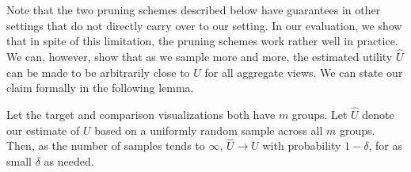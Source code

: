 
Note that the two pruning schemes described below have guarantees
in other settings that do not directly carry over to our setting.
In our evaluation, we show that in spite of this limitation, the pruning schemes
work rather well in practice. 
We can, however, show that as we sample more and more, the estimated utility
$\hat{U}$ can be made to be arbitrarily close to $U$ for all aggregate views.
We can state our claim formally in the following lemma. 

\begin{lemma}
Let the target and comparison visualizations
both have $m$ groups.
Let $\hat{U}$ denote our estimate of $U$ based on a uniformly random sample 
across all $m$ groups. 
Then, as the number of samples tends to $\infty$, $\hat{U} \rightarrow U$
with probability $1-\delta$, for as small $\delta$ as needed.
\end{lemma}



